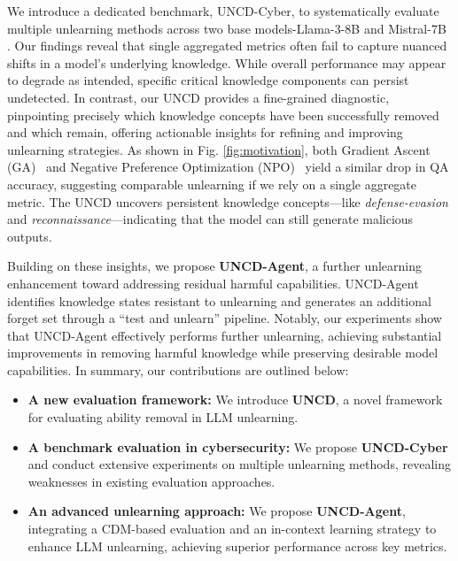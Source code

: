 We introduce a dedicated benchmark, UNCD-Cyber, to systematically evaluate multiple unlearning methods across two base models-Llama-3-8B \citep{dubey2024Llama} and Mistral-7B \citep{jiang2023mistral}.
Our findings reveal that single aggregated metrics often fail to capture nuanced shifts in a model’s underlying knowledge.  While overall performance may appear to degrade as intended, specific critical knowledge components can persist undetected. In contrast, our UNCD provides a fine-grained diagnostic, pinpointing precisely which knowledge concepts have been successfully removed and which remain, offering actionable insights for refining and improving unlearning strategies. As shown in Fig. \ref{fig:motivation}, both Gradient Ascent (GA)~\citep{thudi2022unrolling} and Negative Preference Optimization (NPO)~\citep{zhang2024negative} yield a similar drop in QA accuracy, suggesting comparable unlearning if we rely on a single aggregate metric. The UNCD uncovers persistent knowledge concepts—like \emph{defense-evasion} and \emph{reconnaissance}—indicating that the model can still generate malicious outputs.


Building on these insights, we propose \textbf{UNCD-Agent}, a further unlearning enhancement toward addressing residual harmful capabilities. UNCD-Agent identifies knowledge states resistant to unlearning and generates an additional forget set through a “test and unlearn” pipeline. 
Notably, our experiments show that UNCD-Agent effectively performs further unlearning, %
achieving substantial improvements in removing harmful knowledge while preserving desirable model capabilities. In summary, our contributions are outlined below:

\vspace{-7pt}
\begin{itemize}[leftmargin=*,itemsep=2pt,parsep=0pt]
    \item \textbf{A new evaluation framework:} We introduce \textbf{UNCD}, a novel framework 
    for evaluating ability removal in LLM unlearning.
    \item \textbf{A benchmark evaluation in cybersecurity:} We propose \textbf{UNCD-Cyber} and conduct extensive experiments on multiple unlearning methods, revealing weaknesses in existing evaluation approaches.
    \item \textbf{An advanced unlearning approach:} We propose \textbf{UNCD-Agent}, integrating a CDM-based evaluation and an in-context learning strategy to enhance LLM unlearning, achieving superior performance across key metrics.
\end{itemize}
